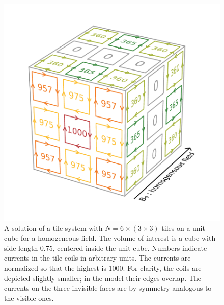 \begin{figure}
  \centering
  \includegraphics[width=0.6\linewidth]{gfx/coils/homogeneous_tiles_norm_1000.pdf}
  \caption{A solution of a tile system with $N = 6 \times (3 \times 3)$ tiles on a unit cube for a homogeneous field. The volume of interest is a cube with side length 0.75, centered inside the unit cube. Numbers indicate currents in the tile coils in arbitrary units. The currents are normalized so that the highest is 1000. For clarity, the coils are depicted slightly smaller; in the model their edges overlap. The currents on the three invisible faces are by symmetry analogous to the visible ones.}
  \label{fig:homogeneous_tiles}
\end{figure}

